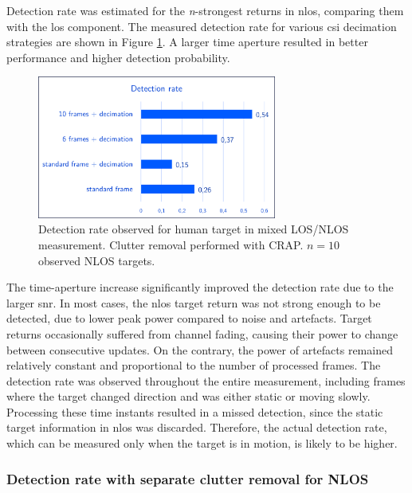 Detection rate was estimated for the \textit{n}-strongest returns in \gls{nlos}, comparing them with the \gls{los} component.
The measured detection rate for various \gls{csi} decimation strategies are shown in Figure \ref{fig:Test1_detect_hist}. A larger time aperture resulted in better performance and higher detection probability.

\begin{figure}[H]
	\centering
	\includegraphics[width=0.7\textwidth]{Images/Test1/detect_hist/detect_hist_human_LMsans.png}
	\caption{Detection rate observed for human target in mixed LOS/NLOS measurement. Clutter removal performed with CRAP. $n=10$ observed NLOS targets.}
	\label{fig:Test1_detect_hist}
\end{figure}

The time-aperture increase significantly improved the detection rate due to the larger \gls{snr}.
In most cases, the \gls{nlos} target return was not strong enough to be detected, due to lower peak power compared to noise and artefacts.
Target returns occasionally suffered from channel fading, causing their power to change between consecutive updates. On the contrary, the power of artefacts remained relatively constant and proportional to the number of processed frames.
The detection rate was observed throughout the entire measurement, including frames where the target changed direction and was either static or moving slowly. Processing these time instants resulted in a missed detection, since the static target information in \gls{nlos} was discarded. 
Therefore, the actual detection rate, which can be measured only when the target is in motion, is likely to be higher.

\subsubsection{Detection rate with separate clutter removal for NLOS}

